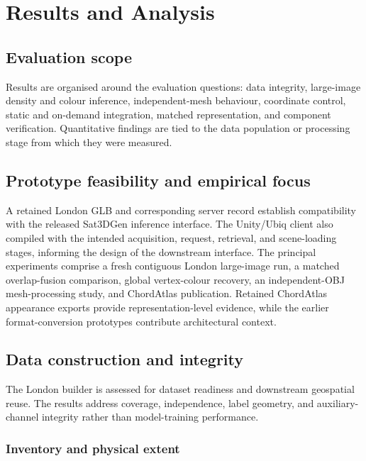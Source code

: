\chapter{Results and Analysis} \label{Chap4}\label{chap:results}

\section{Evaluation scope}

Results are organised around the evaluation questions: data integrity,
large-image density and colour inference, independent-mesh behaviour,
coordinate control, static and on-demand integration, matched representation,
and component verification.  Quantitative findings are tied to the data population or
processing stage from which they were measured.

\section{Prototype feasibility and empirical focus}

A retained London GLB and corresponding server record establish compatibility
with the released Sat3DGen inference interface.  The Unity/Ubiq client also
compiled with the intended acquisition, request, retrieval, and scene-loading
stages, informing the design of the downstream interface.  The principal
experiments comprise a fresh contiguous London large-image run, a matched
overlap-fusion comparison, global vertex-colour recovery, an independent-OBJ
mesh-processing study, and ChordAtlas publication.  Retained ChordAtlas
appearance exports provide representation-level evidence, while the earlier
format-conversion prototypes contribute architectural context.

\section{Data construction and integrity}\label{sec:data-results}

The London builder is assessed for dataset readiness and downstream geospatial
reuse.  The results address coverage, independence, label geometry, and
auxiliary-channel integrity rather than model-training performance.

\subsection{Inventory and physical extent}

